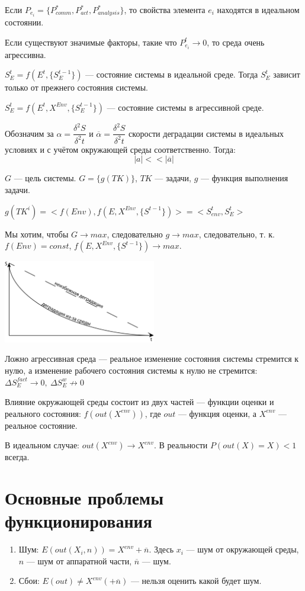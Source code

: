 \documentclass[12pt]{article}
\begin{document}
\begin{sloppypar}
    Если $P_{e_i} = \{P^*_{comm}, P^*_{act}, P^*_{analysis}\}$, то свойства элемента $e_i$ находятся в идеальном состоянии.

    Если существуют значимые факторы, такие что $P_{e_i}^t \rightarrow 0$, то среда очень агрессивна.

    $S_E^t = f(E^t, \{S_E^{t-1}\})$ — состояние системы в идеальной среде. Тогда $S_E^t$ зависит только от прежнего состояния системы.

    $S_E^t = f(E^t, X^{Env}, \{S_E^{t-1}\})$ — состояние системы в агрессивной среде.

    Обозначим за $\alpha = \dfrac{\delta^2S}{\delta^2t}$ и $\overline{\alpha} = \dfrac{\delta^2S}{\delta^2t}$ скорости деградации системы в идеальных условиях и с учётом окружающей среды соответственно. Тогда:
    \[ |a| << |\overline{a}| \]

    $G$ — цель системы. $G = \{g(TK)\}$, $TK$ — задачи, $g$ — функция выполнения задачи.

    $g(TK^i) = <f(Env), f(E, X^{Env}, \{S^{t - 1}\})> = <S_{env}^t, S_E^t>$

    Мы хотим, чтобы $G \rightarrow max$, следовательно $g \rightarrow max$, следовательно, т. к. $f(Env) = const$, $f(E, X^{Env}, \{S^{t - 1}\}) \rightarrow max$.

    \includegraphics[width=0.5\textwidth]{graphics/деградация.png}

    Ложно агрессивная среда — реальное изменение состояния системы стремится к нулю, а изменение рабочего состояния системы к нулю не стремится: $\Delta S_E^{fact} \rightarrow 0,\ \Delta S_E^w \not \rightarrow 0$

    Влияние окружающей среды состоит из двух частей — функции оценки и реального состояния: $f(out(X^{env}))$, где $out$ — функция оценки, а $X^{env}$ — реальное состояние.

    В идеальном случае: $out(X^{env}) \rightarrow X^{env}$. В реальности $P(out(X) = X) < 1$ всегда.

    \section{Основные проблемы функционирования}
    \begin{enumerate}
        \item Шум: $E(out(X_i, n)) = X^{env} + \overline{n}$. Здесь $x_i$ — шум от окружающей среды, $n$ — шум от аппаратной части, $\overline{n}$ — шум.
        \item Сбои: $E(out) \neq X^{env} (+ \overline{n})$ — нельзя оценить какой будет шум.
    \end{enumerate}


\end{sloppypar}
\end{document}
